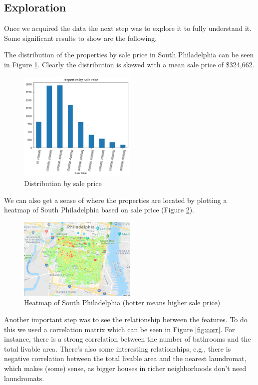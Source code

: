 \documentclass[11pt,a4paper]{article}
\begin{document}
\subsection{Exploration}

Once we acquired the data the next step was to explore it
to fully understand it. Some significant results to show are
the following.

\medskip

The distribution of the properties by sale price in South Philadelphia can be seen in Figure \ref{fig:distribution}.
Clearly the distribution is skewed with a mean sale
price of \$324,662.

\begin{figure}[h]
\centering
\includegraphics[width=0.5\textwidth]{result-data/properties_sale_price}
\caption{Distribution by sale price}
\label{fig:distribution}
\end{figure}

We can also get a sense of where the properties are located
by plotting a heatmap of South Philadelphia based on
sale price (Figure \ref{fig:heatmap}).

\begin{figure}[h]
\centering
\includegraphics[width=0.5\textwidth]{result-data/heatmap}
\caption{Heatmap of South Philadelphia (hotter means higher
sale price)}
\label{fig:heatmap}
\end{figure}

Another important step was to see the relationship
between the features. To do this we used a correlation
matrix which can be seen in Figure \ref{fig:corr}. For instance, there is a strong correlation between the number of bathrooms and the total livable area. There's also some interesting relationships, e.g., there is negative correlation between the total livable area and the nearest laundromat, which makes (some) sense, as bigger houses in richer neighborhoods don't need laundromats.
\end{document}
